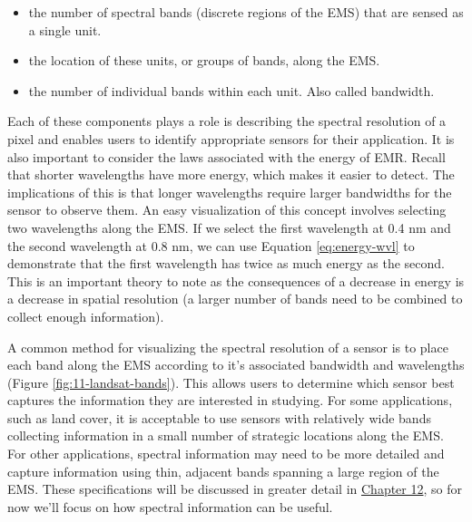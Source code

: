 \documentclass[
]{book}
\begin{document}
\begin{itemize}
\item
  the number of spectral bands (discrete regions of the EMS) that are
  sensed as a single unit.
\item
  the location of these units, or groups of bands, along the EMS.
\item
  the number of individual bands within each unit. Also called
  bandwidth.
\end{itemize}

Each of these components plays a role is describing the spectral
resolution of a pixel and enables users to identify appropriate sensors
for their application. It is also important to consider the laws
associated with the energy of EMR. Recall that shorter wavelengths
have more energy, which makes it easier to detect. The implications
of this is that longer wavelengths require larger bandwidths for the
sensor to observe them. An easy visualization of this concept involves
selecting two wavelengths along the EMS. If we select the first
wavelength at 0.4 nm and the second wavelength at 0.8 nm, we can use
Equation \eqref{eq:energy-wvl} to demonstrate that the first wavelength
has twice as much energy as the second. This is an important theory
to note as the consequences of a decrease in energy is a decrease in
spatial resolution (a larger number of bands need to be combined to
collect enough information).

A common method for visualizing the spectral resolution of a sensor is
to place each band along the EMS according to it's associated bandwidth
and wavelengths (Figure \ref{fig:11-landsat-bands}). This allows users
to determine which sensor best captures the information they are
interested in studying. For some applications, such as land cover, it is
acceptable to use sensors with relatively wide bands collecting
information in a small number of strategic locations along the EMS. For
other applications, spectral information may need to be more detailed
and capture information using thin, adjacent bands spanning a large
region of the EMS. These specifications will be discussed in greater
detail in \href{https://ubc-geomatics-textbook.github.io/geomatics-textbook/remote-sensing-systems.html}{Chapter 12}, so for now we'll focus on how spectral information
can be useful.
\end{document}
